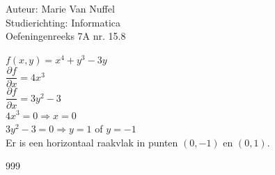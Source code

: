 \documentclass[a4paper]{article}
\begin{document}
  
\noindent \large Auteur: Marie Van Nuffel \\
\noindent \large Studierichting: Informatica\\
\noindent \large Oefeningenreeks 7A nr. 15.8\\

\medskip

\normalsize

$f(x,y) = x^4+y^3-3y$\\

$\dfrac{\partial f}{\partial x} = 4x^3$\\

$\dfrac{\partial f}{\partial x} = 3y^2-3$\\

$4x^3 = 0\Rightarrow x = 0$\\

$3y^2-3 = 0\Rightarrow y = 1$ of $y = -1$\\


Er is een horizontaal raakvlak in punten $(0,-1)$ en $(0,1)$.\\


\begin{thebibliography}{999}
\end{thebibliography}
\end{document}
